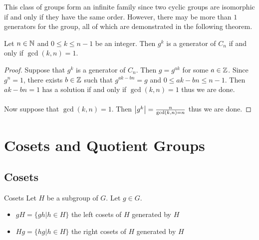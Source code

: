 \documentclass[a4paper]{article}
\begin{document}
This class of groups form an infinite family since two cyclic groups are isomorphic if and only if they have the same order. However, there may be more than $1$ generators for the group, all of which are demonstrated in the following theorem. 

\begin{thm}{}{} Let $n\in\mathbb{N}$ and $0\leq k\leq n-1$ be an integer. Then $g^k$ is a generator of $C_n$ if and only if $\gcd(k,n)=1$. \tcbline
\begin{proof}
Suppose that $g^k$ is a generator of $C_n$. Then $g=g^{ak}$ for some $a\in\mathbb{Z}$. Since $g^n=1$, there exists $b\in\mathbb{Z}$ such that $g^{ak-bn}=g$ and $0\leq ak-bn\leq n-1$. Then $ak-bn=1$ has a solution if and only if $\gcd(k,n)=1$ thus we are done. \\~\\
Now suppose that $\gcd(k,n)=1$. Then $\abs{g^k}=\frac{n}{\gcd(k,n)=n}$ thus we are done. 
\end{proof}
\end{thm}

\pagebreak
\section{Cosets and Quotient Groups}
\subsection{Cosets}
\begin{defn}{Cosets}{} Let $H$ be a subgroup of $G$. Let $g\in G$. 
\begin{itemize}
\item $gH=\{gh|h\in H\}$ the left cosets of $H$ generated by $H$
\item $Hg=\{hg|h\in H\}$ the right cosets of $H$ generated by $H$
\end{itemize}
\end{defn}
\end{document}
